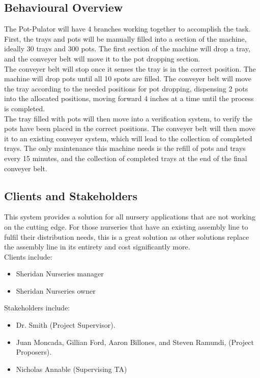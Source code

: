 \documentclass[12pt]{article}
\begin{document}
\subsection{Behavioural Overview}
The Pot-Pulator will have 4 branches working together to accomplish the task. First, the trays and pots will be manually filled into a section of the machine, ideally 30 trays and 300 pots. The first section of the machine will drop a tray, and the conveyer belt will move it to the pot dropping section. \\

\noindent The conveyer belt will stop once it senses the tray is in the correct position. The machine will drop pots until all 10 spots are filled. The conveyer belt will move the tray according to the needed positions for pot dropping, dispensing 2 pots into the allocated positions, moving forward 4 inches at a time until the process is completed. \\

\noindent The tray filled with pots will then move into a verification system, to verify the pots have been placed in the correct positions. The conveyer belt will then move it to an existing conveyer system, which will lead to the collection of completed trays. The only maintenance this machine needs is the refill of pots and trays every 15 minutes, and the collection of completed trays at the end of the final conveyer belt. \\

\subsection{Clients and Stakeholders}
\noindent This system provides a solution for all nursery applications that are not 
working on the cutting edge. For those nurseries that have an existing assembly line 
to fulfil their distribution needs, this is a great solution as other solutions replace the 
assembly line in its entirety and cost significantly more.\\

\noindent Clients include:
\begin{itemize}
    \item Sheridan Nurseries manager
    \item Sheridan Nurseries owner
\end{itemize}
\noindent Stakeholders include:
\begin{itemize}
    \item Dr. Smith (Project Supervisor).
    \item Juan Moncada, Gillian Ford, Aaron Billones, and Steven Ramundi, (Project Proposers).
    \item Nicholas Annable (Supervising TA)
    
\end{itemize}
\end{document}
